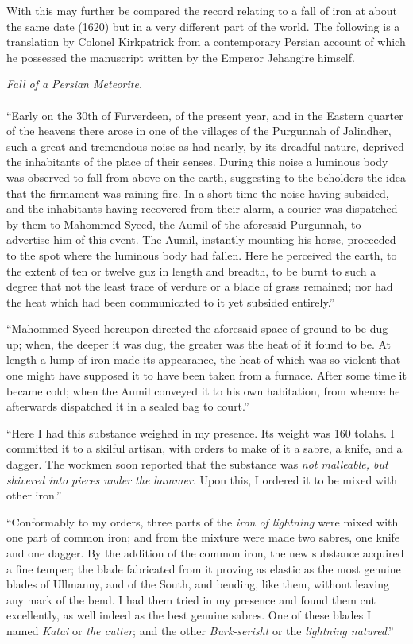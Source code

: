 \documentclass[a4paper, 11pt, oneside]{article}
\begin{document}
With this may further be compared the record relating to a fall of iron at about the same date (1620) but in a very different part of the world. The following is a translation by Colonel Kirkpatrick from a contemporary Persian account of which he possessed the manuscript written by the Emperor Jehangire himself. 
\begin{center}
\emph{Fall of a Persian Meteorite.}
\end{center}
\paragraph{}
``Early on the 30th of Furverdeen, of the present year, and in the Eastern quarter of the heavens there arose in one of the villages of the Purgunnah of Jalindher, such a great and tremendous noise as had nearly, by its dreadful nature, deprived the inhabitants of the place of their senses. During this noise a luminous body was observed to fall from above on the earth, suggesting to the beholders the idea that the firmament was raining fire. In a short time the noise having subsided, and the inhabitants having recovered from their alarm, a courier was dispatched by them to Mahommed Syeed, the Aumil of the aforesaid Purgunnah, to advertise him of this event. The Aumil, instantly mounting his horse, proceeded to the spot where the luminous body had fallen. Here he perceived the earth, to the extent of ten or twelve guz in length and breadth, to be burnt to such a degree that not the least trace of verdure or a blade of grass remained; nor had the heat which had been communicated to it yet subsided entirely.''

``Mahommed Syeed hereupon directed the aforesaid space of ground to be dug up; when, the deeper it was dug, the greater was the heat of it found to be. At length a lump of iron made its appearance, the heat of which was so violent that one might have supposed it to have been taken from a furnace. After some time it became cold; when the Aumil conveyed it to his own habitation, from whence he afterwards dispatched it in a sealed bag to court.''

``Here I had this substance weighed in my presence. Its weight was 160 tolahs. I committed it to a skilful artisan, with orders to make of it a sabre, a knife, and a dagger. The workmen soon reported that the substance was \emph{not malleable, but shivered into pieces under the hammer}. Upon this, I ordered it to be mixed with other iron.''

``Conformably to my orders, three parts of the \emph{iron of lightning} were mixed with one part of common iron; and from the mixture were made two sabres, one knife and one dagger. By the addition of the common iron, the new substance acquired a fine temper; the blade fabricated from it proving as elastic as the most genuine blades of Ullmanny, and of the South, and bending, like them, without leaving any mark of the bend. I had them tried in my presence and found them cut excellently, as well indeed as the best genuine sabres. One of these blades I named \emph{Katai} or \emph{the cutter}; and the other \emph{Burk-serisht} or the \emph{lightning natured}.'' 
\end{document}

